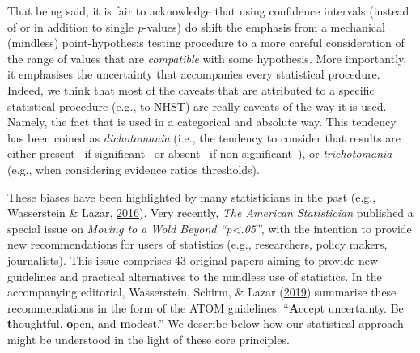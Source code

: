 \documentclass[a4paper,12pt,twoside,openright,oldfontcommands]{memoir}
\begin{document}
That being said, it is fair to acknowledge that using confidence
intervals (instead of or in addition to single \emph{p}-values) do shift
the emphasis from a mechanical (mindless) point-hypothesis testing
procedure to a more careful consideration of the range of values that
are \emph{compatible} with some hypothesis. More importantly, it
emphasises the uncertainty that accompanies every statistical procedure.
Indeed, we think that most of the caveats that are attributed to a
specific statistical procedure (e.g., to NHST) are really caveats of the
way it is used. Namely, the fact that is used in a categorical and
absolute way. This tendency has been coined as \emph{dichotomania}
(i.e., the tendency to consider that results are either present --if
significant-- or absent --if non-significant--), or \emph{trichotomania}
(e.g., when considering evidence ratios thresholds).

These biases have been highlighted by many statisticians in the past
(e.g., Wasserstein \& Lazar,
\protect\hyperlink{ref-wasserstein_asas_2016}{2016}). Very recently,
\emph{The American Statistician} published a special issue on
\emph{Moving to a Wold Beyond ``p\textless{}.05''}, with the intention
to provide new recommendations for users of statistics (e.g.,
researchers, policy makers, journalists). This issue comprises 43
original papers aiming to provide new guidelines and practical
alternatives to the mindless use of statistics. In the accompanying
editorial, Wasserstein, Schirm, \& Lazar
(\protect\hyperlink{ref-wasserstein_moving_2019}{2019}) summarise these
recommendations in the form of the ATOM guidelines: ``\textbf{A}ccept
uncertainty. Be \textbf{t}houghtful, \textbf{o}pen, and
\textbf{m}odest.'' We describe below how our statistical approach might
be understood in the light of these core principles.
\end{document}
